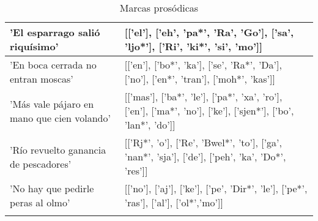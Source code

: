 \begin{longtable}{| p{} | p{} |}
'El esparrago salió riquísimo' & [['el'], ['eh', 'pa*', 'Ra', 'Go'], ['sa', 'ljo*'], ['Ri', 'ki*', 'si', 'mo']] \\ \hline
'En boca cerrada no entran moscas' & [['en'], ['bo*', 'ka'], ['se', 'Ra*', 'Da'], ['no'], ['en*', 'tran'], ['moh*', 'kas']] \\ \hline
'Más vale pájaro en mano que cien volando' & [['mas'], ['ba*', 'le'], ['pa*', 'xa', 'ro'], ['en'], ['ma*', 'no'], ['ke'], ['sjen*'], ['bo', 'lan*', 'do']] \\ \hline
'Río revuelto ganancia de pescadores' & [['Rj*', 'o'], ['Re', 'Bwel*', 'to'], ['ga', 'nan*', 'sja'], ['de'], ['peh', 'ka', 'Do*', 'res']] \\ \hline
'No hay que pedirle peras al olmo' & [['no'], ['aj'], ['ke'], ['pe', 'Dir*', 'le'], ['pe*', 'ras'], ['al'], ['ol*','mo']] \\ \hline

\caption{Marcas prosódicas} 
\label{tab:myfirstlongtable}
\end{longtable}